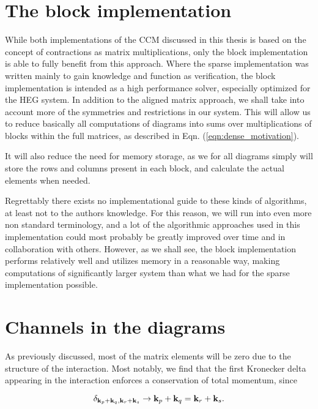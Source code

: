 \section{The block implementation}

While both implementations of the CCM discussed in this thesis is based on the concept of contractions as matrix multiplications, only the block implementation is able to fully benefit from this approach. Where the sparse implementation was written mainly to gain knowledge and function as verification, the block implementation is intended as a high performance solver, especially optimized for the HEG system. In addition to the aligned matrix approach, we shall take into account more of the symmetries and restrictions in our system. This will allow us to reduce basically all computations of diagrams into sums over multiplications of blocks within the full matrices, as described in Eqn. (\ref{eqn:dense_motivation}). 

It will also reduce the need for memory storage, as we for all diagrams simply will store the rows and columns present in each block, and calculate the actual elements when needed. 

Regrettably there exists no implementational guide to these kinds of algorithms, at least not to the authors knowledge. For this reason, we will run into even more non standard terminology, and a lot of the algorithmic approaches used in this implementation could most probably be greatly improved over time and in collaboration with others. However, as we shall see, the block implementation performs relatively well and utilizes memory in a reasonable way, making computations of significantly larger system than what we had for the sparse implementation possible. 

\section{Channels in the diagrams}

As previously discussed, most of the matrix elements will be zero due to the structure of the interaction. 
Most notably, we find that the first Kronecker delta appearing in the interaction enforces a conservation of total momentum, since

\begin{equation}
\delta_{\bold{k}_p + \bold{k}_q, \bold{k}_r + \bold{k}_s} \rightarrow \bold{k}_p + \bold{k}_q = \bold{k}_r + \bold{k}_s .
\label{eqn:momentumconservation}
\end{equation}

